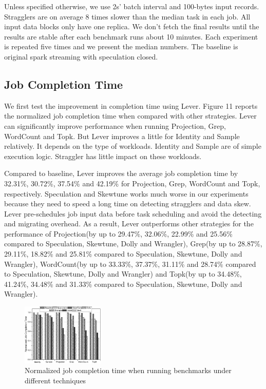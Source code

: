  Unless specified otherwise, we use 2s' batch interval and 100-bytes input records. Stragglers are on average 8 times slower than the median task in each job. All input data blocks only have one replica. We don't fetch the final results until the results are stable after each benchmark runs about 10 minutes. Each experiment is repeated five times and we present the median numbers. The baseline is original spark streaming with speculation closed.

\subsection{Job Completion Time}

  We first test the improvement in completion time using Lever. Figure 11 reports the normalized job completion time when compared with other strategies. Lever can significantly improve performance when running Projection, Grep, WordCount and Topk. But Lever improves a little for Identity and Sample relatively. It depends on the type of workloads. Identity and Sample are of simple execution logic. Straggler has little impact on these workloads.

  Compared to baseline, Lever improves the average job completion time by 32.31\%, 30.72\%, 37.54\% and 42.19\% for Projection, Grep, WordCount and Topk, respectively. Speculation and Skewtune works much worse in our experiments because they need to speed a long time on detecting stragglers and data skew. Lever pre-schedules job input data before task scheduling and avoid the detecting and migrating overhead. As a result, Lever outperforms other strategies for the performance of Projection(by up to 29.47\%, 32.06\%, 22.99\% and 25.56\% compared to Speculation, Skewtune, Dolly and Wrangler), Grep(by up to 28.87\%, 29.11\%, 18.82\% and 25.81\% compared to Speculation, Skewtune, Dolly and Wrangler), WordCount(by up to 33.33\%, 37.37\%, 31.11\% and 28.74\% compared to Speculation, Skewtune, Dolly and Wrangler) and Topk(by up to 34.48\%, 41.24\%, 34.48\% and 31.33\% compared to Speculation, Skewtune, Dolly and Wrangler).
  \begin{figure}[htbp]
    \centering
    \includegraphics[width=0.35\textwidth]{FigureJCT}
    \caption{Normalized job completion time when running benchmarks under different techniques}
    \label{Fig. 11:}
  \end{figure}

